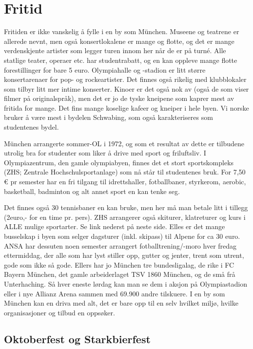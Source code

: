 \chapter{Fritid}


Fritiden er ikke vanskelig å fylle i en by som München. Museene og teatrene er allerede nevnt, men også konsertlokalene er mange og flotte, og det er mange verdenskjente artister som legger turen innom her når de er på turné. Alle statlige teater, operaer etc. har studentrabatt, og en kan oppleve mange flotte forestillinger for bare 5 euro. Olympiahalle og -stadion er litt større konsertarenaer for pop- og rockeartister. Det finnes også rikelig med klubblokaler som tilbyr litt mer intime konserter. Kinoer er det også nok av (også de som viser filmer på originalspråk), men det er jo de tyske kneipene som kaprer mest av fritida for mange. Det fins mange koselige kafeer og kneiper i hele byen. Vi norske bruker å være mest i bydelen Schwabing, som også karakteriseres som studentenes bydel. 


München arrangerte sommer-OL i 1972, og som et resultat av dette er tilbudene utrolig bra for studenter som liker å drive med sport og friluftsliv. I Olympiazentrum, den gamle olympiabyen, finnes det et stort sportskompleks (ZHS; Zentrale Hochschulsportanlage) som nå står til studentenes bruk. For 7,50 \euro{} pr semester har en fri tilgang til idrettshaller, fotballbaner, styrkerom, aerobic, basketball, badminton og alt annet sport en kan tenke seg.




Det finnes også 30 tennisbaner en kan bruke, men her må man betale litt i tillegg (2euro,- for en time pr. pers). ZHS arrangerer også skiturer, klatreturer og kurs i ALLE mulige sportarter. Se link nederst på neste side. Elles er det mange busselskap i byen som selger dagsturer (inkl. skipass) til Alpene for ca 30 euro. ANSA har dessuten noen semester arrangert fotballtrening/-moro hver fredag ettermiddag, der alle som har lyst stiller opp, gutter og jenter, trent som utrent, gode som ikke så gode. Ellers har jo München tre bundesligalag, de rike i FC Bayern München, det gamle arbeiderlaget TSV 1860 München, og de små frå Unterhaching. Så hver eneste lørdag kan man se dem i aksjon på Olympiastadion eller i nye Allianz Arena sammen med 69.900 andre tilskuere.
I en by som München kan en driva med alt, det er bare opp til en selv hvilket  miljø, hvilke organisasjoner og tilbud en oppsøker. 


\section{Oktoberfest og Starkbierfest}

